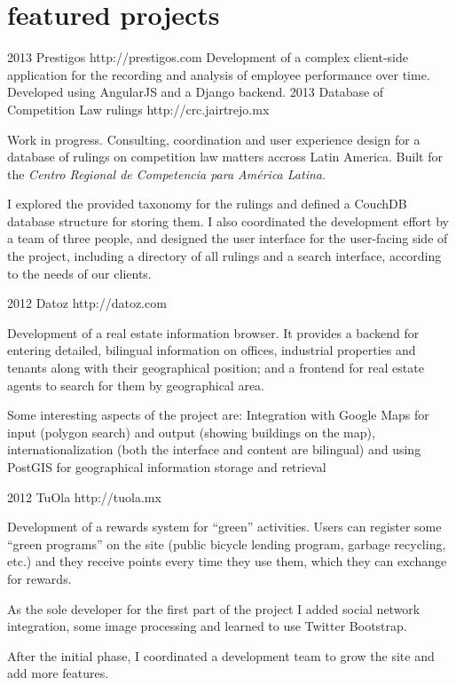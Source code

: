\documentclass[]{friggeri-cv} %
\begin{document}
\section{featured projects}

\begin{entrylist}
\entry
{2013}
{Prestigos}
{http://prestigos.com}
{Development of a complex client-side application for the recording and analysis of employee performance over time. Developed using AngularJS and a Django backend.}
\entry
{2013}
{Database of Competition Law rulings}
{http://crc.jairtrejo.mx}
{Work in progress. Consulting, coordination and user experience design for a database of rulings on competition law matters accross Latin America. Built for the \emph{Centro Regional de Competencia para América Latina}.

I explored the provided taxonomy for the rulings and defined a CouchDB database structure for storing them. I also coordinated the development effort by a team of three people, and designed the user interface for the user-facing side of the project, including a directory of all rulings and a search interface, according to the needs of our clients.}
\entry
{2012}
{Datoz}
{http://datoz.com}
{Development of a real estate information browser. It provides a backend for entering detailed, bilingual information on offices, industrial properties and tenants along with their geographical position; and a frontend for real estate agents to search for them by geographical area.

Some interesting aspects of the project are: Integration with Google Maps for input (polygon search) and output (showing buildings on the map), internationalization (both the interface and content are bilingual) and using PostGIS for geographical information storage and retrieval}
\entry
{2012}
{TuOla}
{http://tuola.mx}
{Development of a rewards system for “green” activities. Users can register some “green programs” on the site (public bicycle lending program, garbage recycling, etc.) and they receive points every time they use them, which they can exchange for rewards.

As the sole developer for the first part of the project I added social network integration, some image processing and learned to use Twitter Bootstrap.

After the initial phase, I coordinated a development team to grow the site and add more features.}
\end{entrylist}
\end{document}
